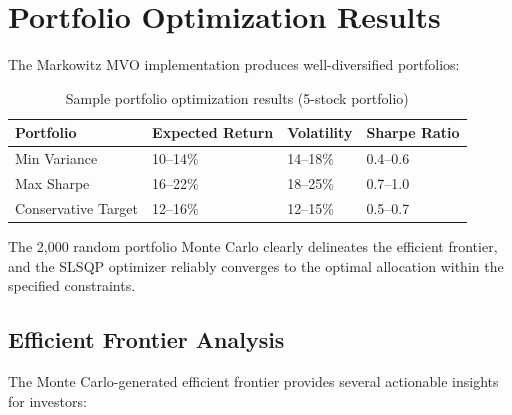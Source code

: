 \documentclass[12pt, a4paper, oneside]{report}
\begin{document}
\section{Portfolio Optimization Results}
\label{sec:results_portfolio}

The Markowitz MVO implementation produces well-diversified portfolios:

\begin{table}[H]
\centering
\caption{Sample portfolio optimization results (5-stock portfolio)}
\label{tab:portfolio_results}
\begin{tabular}{@{}llll@{}}
\toprule
\textbf{Portfolio} & \textbf{Expected Return} & \textbf{Volatility} & \textbf{Sharpe Ratio} \\
\midrule
Min Variance & 10--14\% & 14--18\% & 0.4--0.6 \\
Max Sharpe & 16--22\% & 18--25\% & 0.7--1.0 \\
Conservative Target & 12--16\% & 12--15\% & 0.5--0.7 \\
\bottomrule
\end{tabular}
\end{table}

The 2,000 random portfolio Monte Carlo clearly delineates the efficient frontier, and the SLSQP optimizer reliably converges to the optimal allocation within the specified constraints.

\subsection{Efficient Frontier Analysis}

The Monte Carlo-generated efficient frontier provides several actionable insights for investors:
\end{document}
